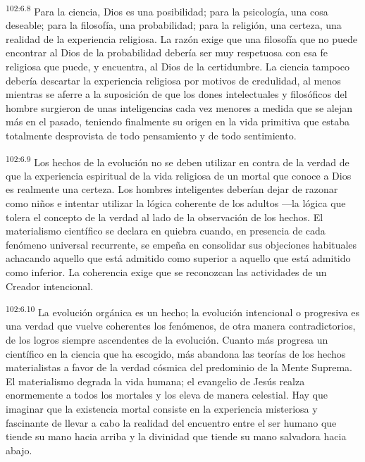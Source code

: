 \documentclass[twoside, 11pt]{book}
\begin{document}
\par
\textsuperscript{102:6.8} Para la ciencia, Dios es una posibilidad; para la psicología, una cosa deseable; para la filosofía, una probabilidad; para la religión, una certeza, una realidad de la experiencia religiosa. La razón exige que una filosofía que no puede encontrar al Dios de la probabilidad debería ser muy respetuosa con esa fe religiosa que puede, y encuentra, al Dios de la certidumbre. La ciencia tampoco debería descartar la experiencia religiosa por motivos de credulidad, al menos mientras se aferre a la suposición de que los dones intelectuales y filosóficos del hombre surgieron de unas inteligencias cada vez menores a medida que se alejan más en el pasado, teniendo finalmente su origen en la vida primitiva que estaba totalmente desprovista de todo pensamiento y de todo sentimiento.

\par
\textsuperscript{102:6.9} Los hechos de la evolución no se deben utilizar en contra de la verdad de que la experiencia espiritual de la vida religiosa de un mortal que conoce a Dios es realmente una certeza. Los hombres inteligentes deberían dejar de razonar como niños e intentar utilizar la lógica coherente de los adultos ---la lógica que tolera el concepto de la verdad al lado de la observación de los hechos. El materialismo científico se declara en quiebra cuando, en presencia de cada fenómeno universal recurrente, se empeña en consolidar sus objeciones habituales achacando aquello que está admitido como superior a aquello que está admitido como inferior. La coherencia exige que se reconozcan las actividades de un Creador intencional.

\par
\textsuperscript{102:6.10} La evolución orgánica es un hecho; la evolución intencional o progresiva es una verdad que vuelve coherentes los fenómenos, de otra manera contradictorios, de los logros siempre ascendentes de la evolución. Cuanto más progresa un científico en la ciencia que ha escogido, más abandona las teorías de los hechos materialistas a favor de la verdad cósmica del predominio de la Mente Suprema. El materialismo degrada la vida humana; el evangelio de Jesús realza enormemente a todos los mortales y los eleva de manera celestial. Hay que imaginar que la existencia mortal consiste en la experiencia misteriosa y fascinante de llevar a cabo la realidad del encuentro entre el ser humano que tiende su mano hacia arriba y la divinidad que tiende su mano salvadora hacia abajo.
\end{document}
